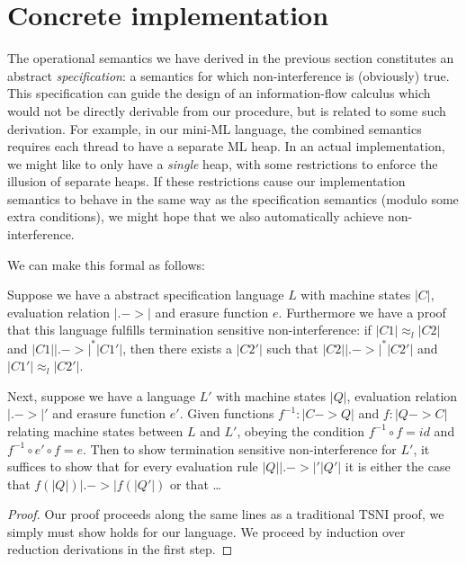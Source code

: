 \section{Concrete implementation}
\label{sec:concrete}

The operational semantics we have derived in the previous section
constitutes an abstract \emph{specification}: a semantics for which
non-interference is (obviously) true.  This specification can guide the
design of an information-flow calculus which would not be directly
derivable from our procedure, but is related to some such derivation.
For example, in our mini-ML language, the combined semantics requires
each thread to have a separate ML heap.  In an actual implementation, we
might like to only have a \emph{single} heap, with some restrictions to
enforce the illusion of separate heaps.  If these restrictions cause our
implementation semantics to behave in the same way as the specification
semantics (modulo some extra conditions), we might hope that we also
automatically achieve non-interference.

We can make this formal as follows: 

\begin{theorem}
    Suppose we have a abstract specification language $L$ with machine
    states $|C|$, evaluation relation $|.->|$ and erasure function $e$.
    Furthermore we have a proof that this language fulfills termination
    sensitive non-interference: if $|C1| \approx_l |C2|$ and $|C1|
    |.->|^* |C1'|$, then there exists a $|C2'|$ such that $|C2| |.->|^*
    |C2'|$ and $|C1'| \approx_l |C2'|$.

    Next, suppose we have a language $L'$ with machine states $|Q|$,
    evaluation relation $|.->|'$ and erasure function $e'$.  Given
    functions $f^{-1} : |C -> Q|$ and $f : |Q -> C|$ relating machine
    states between $L$ and $L'$, obeying the condition $f^{-1} \circ f =
    id$ and $f^{-1} \circ e' \circ f = e$.  Then to show termination sensitive non-interference for $L'$,
    it suffices to show that for every evaluation rule $|Q| |.->|' |Q'|$
    it is either the case that $f(|Q|) |.->| f(|Q'|)$ or that
    \ldots
\end{theorem}

\begin{proof}
Our proof proceeds along the same lines as a traditional TSNI proof,
we simply must show  holds for our language.  We proceed by induction
over reduction derivations in the first step.
\end{proof}

